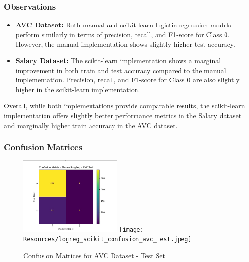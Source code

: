 \documentclass[a4paper,12pt]{article}
\begin{document}
\subsubsection{Observations}
\begin{itemize}
    \item \textbf{AVC Dataset:} Both manual and scikit-learn logistic regression models perform similarly in terms of precision, recall, and F1-score for Class 0. However, the manual implementation shows slightly higher test accuracy.
    \item \textbf{Salary Dataset:} The scikit-learn implementation shows a marginal improvement in both train and test accuracy compared to the manual implementation. Precision, recall, and F1-score for Class 0 are also slightly higher in the scikit-learn implementation.
\end{itemize}

Overall, while both implementations provide comparable results, the scikit-learn implementation offers slightly better performance metrics in the Salary dataset and marginally higher train accuracy in the AVC dataset.

\subsubsection{Confusion Matrices}

\begin{figure}[H]
    \centering
    \includegraphics[width=0.45\textwidth]{Resources/logreg_manual_confusion_avc_test.jpeg}
    \texttt{[image: Resources/logreg\_scikit\_confusion\_avc\_test.jpeg]}
    \caption{Confusion Matrices for AVC Dataset - Test Set}
    \label{fig:confusion_avc_test}
\end{figure}
\end{document}
